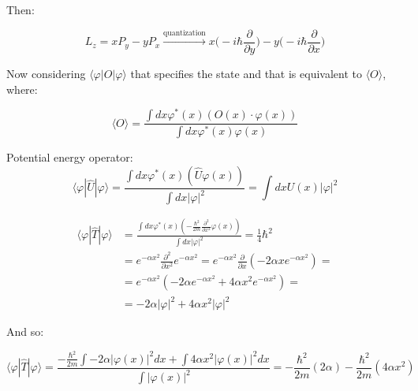     Then:

    $$L_z = xP_y - yP_x\xrightarrow[]{\text{quantization}}x\biggl(-i\hbar\frac{\partial}{\partial y}\biggr) - y\biggl(-i\hbar\frac{\partial}{\partial x}\biggr)$$

    Now considering $\langle \varphi|O|\varphi\rangle$ that specifies the state and that is equivalent to $\langle O\rangle$, where:

    $$\langle O\rangle = \frac{\int dx \varphi^*(x)(O(x)\cdot\varphi(x))}{\int dx\varphi^*(x)\varphi(x)}$$

    Potential energy operator:
    $$\langle\varphi|\hat{U}|\varphi\rangle =\frac{\int dx\varphi^*(x)(\hat{U}\varphi(x))}{\int dx |\varphi|^2}= \int d x U(x) |\varphi|^2$$

    \begin{align*}
      \langle\varphi|\hat{T}|\varphi\rangle &=\frac{\int dx\varphi^*(x)(-\frac{\hbar^2}{2m}\frac{\partial^2}{\partial x^2}\varphi(x))}{\int dx |\varphi|^2}= \frac{1}{4}\hbar^2\\
                                      &=e^{-\alpha x^2}\frac{\partial^2}{\partial x^2}e^{-\alpha x^2} = e^{-\alpha x^2}\frac{\partial}{\partial x}(-2\alpha xe^{-\alpha x^2}) =\\
                                      &=e^{-\alpha x^2}(-2\alpha e^{-\alpha x^2}+4\alpha x^2e^{-\alpha x^2})= \\
                                      &=-2\alpha|\varphi|^2 + 4\alpha x^2|\varphi|^2
    \end{align*}

   
    And so:

    $$\langle\varphi|\hat{T}|\varphi\rangle = \frac{-\frac{\hbar^2}{2m}\int -2\alpha |\varphi(x)|^2 dx +\int 4 \alpha x^2|\varphi(x)|^2 dx}{\int|\varphi(x)|^2} = -\frac{\hbar^2}{2m} (2\alpha) -\frac{\hbar^2}{2m} (4\alpha x^2) $$



